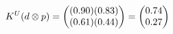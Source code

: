 \documentclass[preview]{standalone}
\begin{document}
\begin{align*}
\special{dvisvgm:raw <g id='unique000'>}K^U(d \otimes p) = \begin{pmatrix} (0.90)(0.83) \\ (0.61)(0.44) \end{pmatrix} = \begin{pmatrix} 0.74 \\ 0.27 \end{pmatrix}\special{dvisvgm:raw </g>}
\end{align*}
\end{document}
